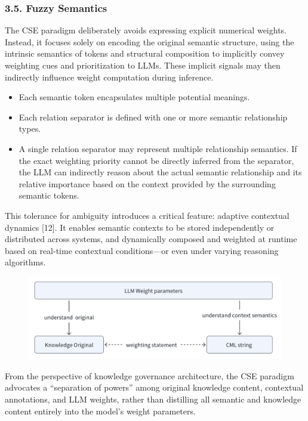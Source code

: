\documentclass[conference]{IEEEtran}
\begin{document}
\subsubsection{3.5. Fuzzy Semantics}\label{35-fuzzy-semantics}

The CSE paradigm deliberately avoids expressing explicit numerical
weights. Instead, it focuses solely on encoding the original semantic
structure, using the intrinsic semantics of tokens and structural
composition to implicitly convey weighting cues and prioritization to
LLMs. These implicit signals may then indirectly influence weight
computation during inference.

\begin{itemize}
\item
  Each semantic token encapsulates multiple potential meanings.
\item
  Each relation separator is defined with one or more semantic
  relationship types.
\item
  A single relation separator may represent multiple relationship
  semantics. If the exact weighting priority cannot be directly inferred
  from the separator, the LLM can indirectly reason about the actual
  semantic relationship and its relative importance based on the context
  provided by the surrounding semantic tokens.
\end{itemize}

This tolerance for ambiguity introduces a critical feature: adaptive
contextual dynamics {[}12{]}. It enables semantic contexts to be stored
independently or distributed across systems, and dynamically composed
and weighted at runtime based on real-time contextual conditions---or
even under varying reasoning algorithms.

\begin{figure}[htbp]
\centering
\includegraphics[width=0.8\linewidth]{assets/image-20250419104035008.png}
\end{figure}


From the perspective of knowledge governance architecture, the CSE
paradigm advocates a ``separation of powers'' among original knowledge
content, contextual annotations, and LLM weights, rather than distilling
all semantic and knowledge content entirely into the model's weight
parameters.
\end{document}
